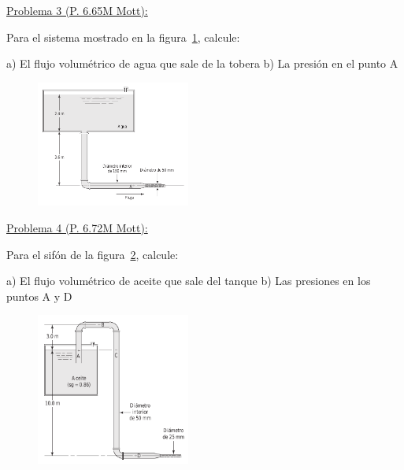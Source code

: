 \documentclass[11pt]{report}
\begin{document}

\newpage
\vspace{1cm}

\underline {Problema 3 (P. 6.65M Mott):}

\vspace{0.2cm}

Para el sistema mostrado en la figura~\ref{fig:fig3}, calcule:\newline

a) El flujo volum\'etrico de agua que sale de la tobera\newline
b) La presi\'on en el punto A

\begin{figure}[H]
\centering\includegraphics[width=0.45\textwidth]{p3.png}
\caption{\label{fig:fig3} }
\end{figure}

\underline {Problema 4 (P. 6.72M Mott):}

\vspace{0.2cm}

Para el sif\'on de la figura~\ref{fig:fig4}, calcule:\newline

a) El flujo volum\'etrico de aceite que sale del tanque\newline
b) Las presiones en los puntos A y D

\begin{figure}[H]
\centering\includegraphics[width=0.45\textwidth]{p4.png}
\caption{\label{fig:fig4}}
\end{figure}
\end{document}
